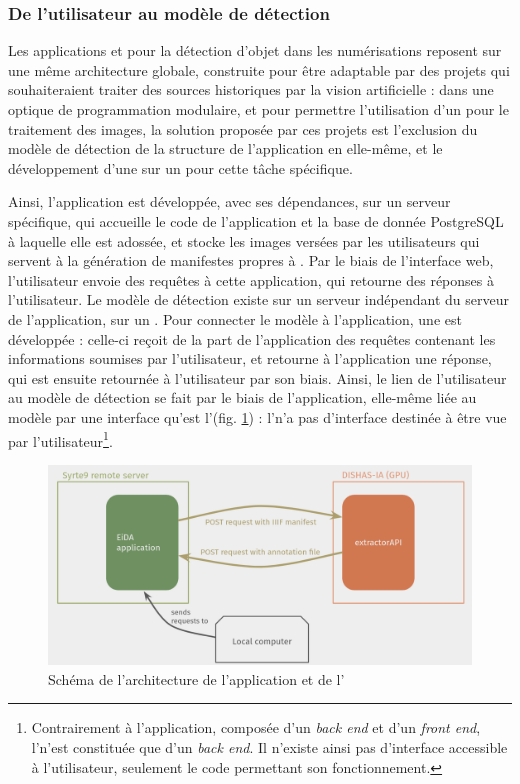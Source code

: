     \subsubsection{De l'utilisateur au modèle de détection}
	Les applications \vhs et \eida pour la détection d'objet dans les numérisations reposent sur une même architecture globale, construite pour être adaptable par des projets qui souhaiteraient traiter des sources historiques par la vision artificielle : dans une optique de programmation modulaire, et pour permettre l'utilisation d'un \gpu pour le traitement des images, la solution proposée par ces projets est l'exclusion du modèle de détection de la structure de l'application en elle-même, et le développement d'une \api sur un \gpu pour cette tâche spécifique.
	
	Ainsi, l'application est développée, avec ses dépendances, sur un serveur spécifique, qui accueille le code de l'application et la base de donnée PostgreSQL à laquelle elle est adossée, et stocke les images versées par les utilisateurs qui servent à la génération de manifestes \iiif propres à \eida. Par le biais de l'interface web, l'utilisateur envoie des requêtes à cette application, qui retourne des réponses à l'utilisateur. Le modèle de détection existe sur un serveur indépendant du serveur de l'application, sur un \gpu. Pour connecter le modèle à l'application, une \api est développée : celle-ci reçoit de la part de l'application \eida des requêtes contenant les informations soumises par l'utilisateur, et retourne à l'application une réponse, qui est ensuite retournée à l'utilisateur par son biais. Ainsi, le lien de l'utilisateur au modèle de détection se fait par le biais de l'application, elle-même liée au modèle par une interface qu'est l'\api (fig. \ref{fig:archi_eida}) : l'\api n'a pas d'interface destinée à être vue par l'utilisateur\footnote{Contrairement à l'application, composée d'un \textit{back end} et d'un \textit{front end}, l'\api n'est constituée que d'un \textit{back end}. Il n'existe ainsi pas d'interface accessible à l'utilisateur, seulement le code permettant son fonctionnement.}.
	
	\begin{figure}[h]
		\centering
		\includegraphics[width=15cm]{images/schema_archi.png}
		\caption{Schéma de l'architecture de l'application \eida et de l'\api \exapi}
		\label{fig:archi_eida}
	\end{figure}

